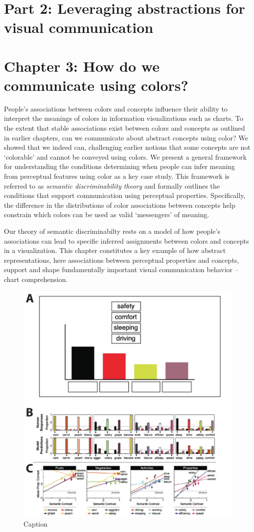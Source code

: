 \documentclass{Dissertate}
\begin{document}
\section*{\textbf{Part 2: Leveraging abstractions for visual communication}}

\section*{Chapter 3: How do we communicate using colors?}

People’s associations between colors and concepts influence their ability to interpret the meanings of colors in information visualizations such as charts.
To the extent that stable associations exist between colors and concepts as outlined in earlier chapters, can we communicate about abstract concepts using color?
We showed that we indeed can, challenging earlier notions that some concepts are not `colorable' and cannot be conveyed using colors. We present a general framework for understanding the conditions determining when people can infer meaning from perceptual features using color as a key case study. This framework is referred to as \textit{semantic discriminability theory} and formally outlines the conditions that support communication using perceptual properties.
Specifically, the difference in the distributions of color associations between concepts help constrain which colors can be used as valid `messengers' of meaning.

Our theory of semantic discriminabilty rests on a model of how people's associations can lead to specific inferred assignments between colors and concepts in a visualization.
This chapter constitutes a key example of how abstract representations, here associations between perceptual properties and concepts, support and shape fundamentally important visual communication behavior -- chart comprehension.


\begin{figure}[htpb!]
    \centering
    \includegraphics[width=.8\linewidth]{proposal/figures/chap3.pdf}
    \caption{Caption}
    \label{fig:enter-label}
\end{figure}
\end{document}
